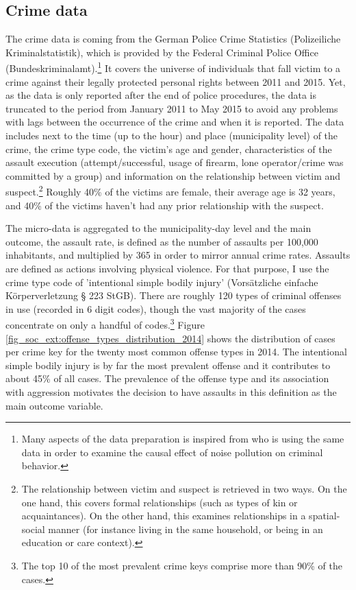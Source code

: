 \documentclass[11pt, a4paper]{article} %
\begin{document}
\subsection{Crime data}
The crime data is coming from the German Police Crime Statistics (Polizeiliche Kriminalstatistik), which is provided by the Federal Criminal Police Office (Bundeskriminalamt).\footnote{Many aspects of the data preparation is inspired from \cite{hener2019noise} who is using the same data in order to examine the causal effect of noise pollution on criminal behavior.} It covers the universe of individuals that fall victim to a crime against their legally protected personal rights between 2011 and 2015. Yet, as the data is only reported after the end of police procedures, the data is truncated to the period from January 2011 to May 2015 to avoid any problems with lags between the occurrence of the crime and when it is reported. The data includes next to the time (up to the hour) and place (municipality level) of the crime, the crime type code, the victim's age and gender, characteristics of the assault execution (attempt/successful, usage of firearm, lone operator/crime was committed by a group) and information on the relationship between victim and suspect.\footnote{The relationship between victim and suspect is retrieved in two ways. On the one hand, this covers formal relationships (such as types of kin or acquaintances). On the other hand, this examines relationships in a spatial-social manner (for instance living in the same household, or being in an education or care context).} Roughly 40\% of the victims are female, their average age is 32 years, and 40\% of the victims haven't had any prior relationship with the suspect.

The micro-data is aggregated to the municipality-day level and the main outcome, the assault rate, is defined as the number of assaults per 100,000 inhabitants, and multiplied by 365 in order to mirror annual crime rates. Assaults are defined as actions involving physical violence. For that purpose, I use the crime type code of 'intentional simple bodily injury' (Vorsätzliche einfache Körperverletzung § 223 StGB). There are roughly 120 types of criminal offenses in use (recorded in 6 digit codes), though the vast majority of the cases concentrate on only a handful of codes.\footnote{The top 10 of the most prevalent crime keys comprise more than 90\% of the cases.} Figure \ref{fig_soc_ext:offense_types_distribution_2014} shows the distribution of cases per crime key for the twenty most common offense types in 2014. The intentional simple bodily injury is by far the most prevalent offense and it contributes to about 45\% of all cases. The prevalence of the offense type and its association with aggression motivates the decision to have assaults in this definition as the main outcome variable.
\end{document}

